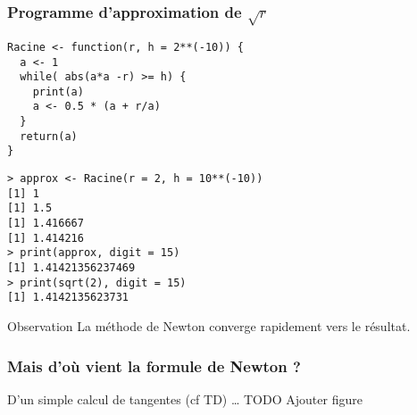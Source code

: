 \documentclass[10pt]{beamer}
\begin{document}
\begin{frame}[fragile]
  \frametitle{Programme d'approximation de $\sqrt{r}$}
  \begin{lstlisting}[style=editor]
Racine <- function(r, h = 2**(-10)) {
  a <- 1
  while( abs(a*a -r) >= h) {
    print(a)
    a <- 0.5 * (a + r/a)
  }
  return(a)
}    
\end{lstlisting}

\begin{lstlisting}
> approx <- Racine(r = 2, h = 10**(-10))
[1] 1
[1] 1.5
[1] 1.416667
[1] 1.414216
> print(approx, digit = 15)
[1] 1.41421356237469
> print(sqrt(2), digit = 15)
[1] 1.4142135623731
\end{lstlisting}

\begin{block}{Observation}
  La méthode de Newton converge rapidement vers le résultat.
\end{block}
\end{frame}

\begin{frame}
  \frametitle{Mais d'où vient la formule de Newton ?}
  D'un simple calcul de tangentes (cf TD) \dots
  TODO Ajouter figure 
\end{frame}



 \questionSlide

 \appendix
 \backupSlides







\end{document}
